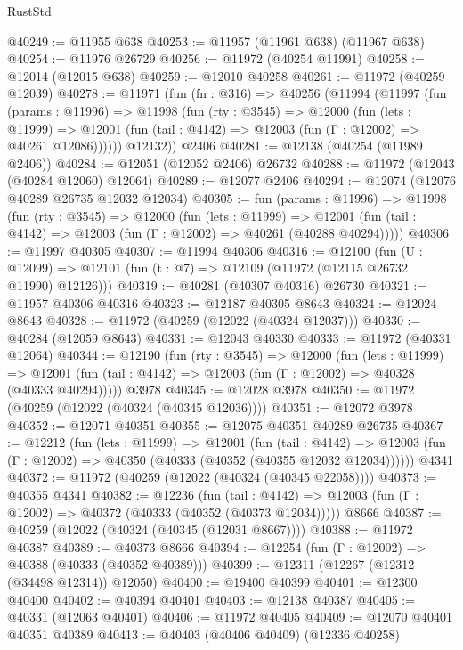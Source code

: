 \begin{lexlean}{RustStd}
\begin{coremodule}
@40249 := @11955 @638
@40253 := @11957 (@11961 @638) (@11967 @638)
@40254 := @11976 @26729
@40256 := @11972 (@40254 @11991)
@40258 := @12014 (@12015 @638)
@40259 := @12010 @40258
@40261 := @11972 (@40259 @12039)
@40278 := @11971
    (fun (fn : @316) =>
    @40256
      (@11994
        (@11997
          (fun (params : @11996) =>
          @11998
            (fun (rty : @3545) =>
            @12000
              (fun (lets : @11999) =>
              @12001 (fun (tail : @4142) => @12003 (fun (Γ : @12002) => @40261 @12086))))))
        @12132))
    @2406
@40281 := @12138 (@40254 (@11989 @2406))
@40284 := @12051 (@12052 @2406) @26732
@40288 := @11972 (@12043 (@40284 @12060) @12064)
@40289 := @12077 @2406
@40294 := @12074 (@12076 @40289 @26735 @12032 @12034)
@40305 := fun (params : @11996) =>
  @11998
    (fun (rty : @3545) =>
    @12000
      (fun (lets : @11999) =>
      @12001 (fun (tail : @4142) => @12003 (fun (Γ : @12002) => @40261 (@40288 @40294)))))
@40306 := @11997 @40305
@40307 := @11994 @40306
@40316 := @12100
    (fun (U : @12099) => @12101 (fun (t : @7) => @12109 (@11972 (@12115 @26732 @11990) @12126)))
@40319 := @40281 (@40307 @40316) @26730
@40321 := @11957 @40306 @40316
@40323 := @12187 @40305 @8643
@40324 := @12024 @8643
@40328 := @11972 (@40259 (@12022 (@40324 @12037)))
@40330 := @40284 (@12059 @8643)
@40331 := @12043 @40330
@40333 := @11972 (@40331 @12064)
@40344 := @12190
    (fun (rty : @3545) =>
    @12000
      (fun (lets : @11999) =>
      @12001 (fun (tail : @4142) => @12003 (fun (Γ : @12002) => @40328 (@40333 @40294)))))
    @3978
@40345 := @12028 @3978
@40350 := @11972 (@40259 (@12022 (@40324 (@40345 @12036))))
@40351 := @12072 @3978
@40352 := @12071 @40351
@40355 := @12075 @40351 @40289 @26735
@40367 := @12212
    (fun (lets : @11999) =>
    @12001
      (fun (tail : @4142) =>
      @12003 (fun (Γ : @12002) => @40350 (@40333 (@40352 (@40355 @12032 @12034))))))
    @4341
@40372 := @11972 (@40259 (@12022 (@40324 (@40345 @22058))))
@40373 := @40355 @4341
@40382 := @12236
    (fun (tail : @4142) => @12003 (fun (Γ : @12002) => @40372 (@40333 (@40352 (@40373 @12034)))))
    @8666
@40387 := @40259 (@12022 (@40324 (@40345 (@12031 @8667))))
@40388 := @11972 @40387
@40389 := @40373 @8666
@40394 := @12254 (fun (Γ : @12002) => @40388 (@40333 (@40352 @40389)))
@40399 := @12311 (@12267 (@12312 (@34498 @12314)) @12050)
@40400 := @19400 @40399
@40401 := @12300 @40400
@40402 := @40394 @40401
@40403 := @12138 @40387
@40405 := @40331 (@12063 @40401)
@40406 := @11972 @40405
@40409 := @12070 @40401 @40351 @40389
@40413 := @40403 (@40406 @40409) (@12336 @40258)

\end{coremodule}
\end{lexlean}
